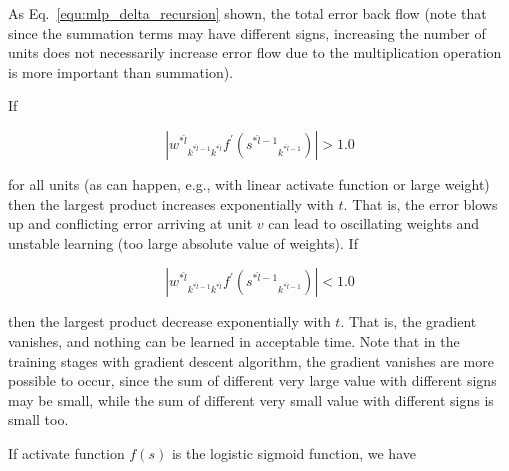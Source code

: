 \documentclass[runningheads,openany]{xhlPaper}
\begin{document}
As Eq.~\ref{equ:mlp_delta_recursion} shown, the total error back flow (note that since the summation terms may have different signs, increasing the number of units does not necessarily increase error flow due to the multiplication operation is more important than summation).

If 

\begin{displaymath}
|{{w^{*\hat l}}_{{k^{*\hat l - 1}}{k^{*\hat l}}}{f^{'}}\left( {{s^{*\hat l - 1}}_{{k^{*\hat l - 1}}}} \right)}| > 1.0
\end{displaymath}

for all units (as can happen, e.g., with linear activate function or large weight) then the largest product increases exponentially with $t$. That is, the error blows up and conflicting error arriving at unit $v$ can lead to oscillating weights and unstable learning (too large absolute value of weights). If

\begin{displaymath}
|{{w^{*\hat l}}_{{k^{*\hat l - 1}}{k^{*\hat l}}}{f^{'}}\left( {{s^{*\hat l - 1}}_{{k^{*\hat l - 1}}}} \right)}| < 1.0
\end{displaymath}

then the largest product decrease exponentially with $t$. That is, the gradient vanishes, and nothing can be learned in acceptable time. Note that in the training stages with gradient descent algorithm, the gradient vanishes are more possible to occur, since the sum of different very large value with different signs may be small, while the sum of different very small value with different signs is small too.

If activate function $f\left( s \right)$ is the logistic sigmoid function, we have
\end{document}
